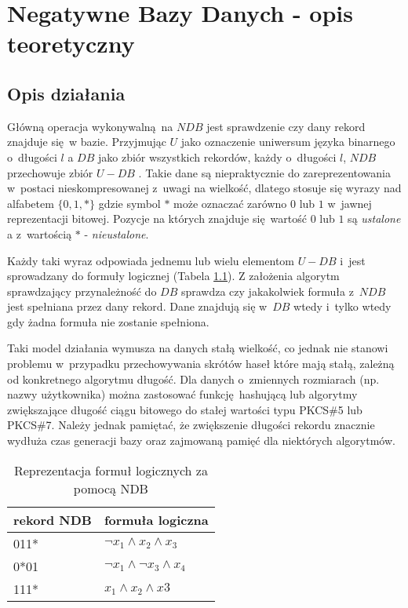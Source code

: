 \chapter{Negatywne Bazy Danych - opis teoretyczny}
\section{Opis działania}
Główną operacja wykonywalną na $NDB$ jest sprawdzenie czy dany rekord znajduje się w bazie. Przyjmując $U$ 
jako oznaczenie uniwersum języka binarnego o~długości $l$ a $DB$ jako zbiór wszystkich rekordów, każdy o~długości $l$,
$NDB$ przechowuje zbiór $U - DB$ \cite{NRI-Esponda}. Takie dane są niepraktycznie do zareprezentowania w~postaci nieskompresowanej z~uwagi na wielkość, dlatego
stosuje się wyrazy nad alfabetem $\{0,1,*\}$ gdzie symbol $*$ może oznaczać zarówno $0$ lub $1$ w~jawnej reprezentacji bitowej.
Pozycje na których znajduje się wartość $0$ lub $1$ są \textit{ustalone} a z~wartością $*$ - \textit{nieustalone}.

Każdy taki wyraz odpowiada jednemu lub wielu elementom $U - DB$ i~jest sprowadzany do formuły logicznej (Tabela \ref{Tbl:NDB-logform}).
Z założenia algorytm sprawdzający przynależność do $DB$ sprawdza czy jakakolwiek formuła z~$NDB$ jest spełniana przez dany rekord. 
Dane znajdują się w~$DB$ wtedy i~tylko wtedy gdy żadna formuła nie zostanie spełniona. 

Taki model działania wymusza na danych stałą wielkość,
co jednak nie stanowi problemu w~przypadku przechowywania skrótów haseł które mają stałą, zależną od konkretnego algorytmu długość.
Dla danych o~zmiennych rozmiarach (np. nazwy użytkownika) można zastosować funkcję hashującą lub algorytmy zwiększające długość ciągu bitowego do stałej wartości typu PKCS\#5 lub PKCS\#7.
Należy jednak pamiętać, że zwiększenie długości rekordu znacznie wydłuża czas generacji bazy oraz zajmowaną pamięć dla niektórych algorytmów. 

\begin{table}[h]
    \centering
    \label{Tbl:NDB-logform}
    \begin{tabular}{|l|l|}
        \hline
        rekord NDB & formuła logiczna                       \\ \hline
        011*       & $\neg{x_1} \land x_2 \land x_3$        \\ \hline
        0*01       & $\neg{x_1} \land \neg{x_3} \land x_4 $ \\ \hline
        111*       & $x_1 \land x_2 \land x3$               \\ \hline
    \end{tabular}
    \caption{Reprezentacja formuł logicznych za pomocą NDB}
\end{table}

